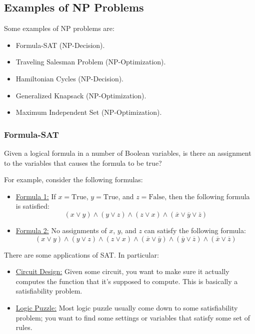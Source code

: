 \documentclass[letterpaper]{article}
\begin{document}
\subsection{Examples of NP Problems}
Some examples of NP problems are: 
\begin{itemize}
    \item Formula-SAT (NP-Decision). 
    \item Traveling Salesman Problem (NP-Optimization). 
    \item Hamiltonian Cycles (NP-Decision). 
    \item Generalized Knapsack (NP-Optimization). 
    \item Maximum Independent Set (NP-Optimization). 
\end{itemize}

\subsubsection{Formula-SAT}
Given a logical formula in a number of Boolean variables, is there an assignment to the variables that causes the formula to be true? 

\bigskip

For example, consider the following formulas: 
\begin{itemize}
    \item \underline{Formula 1:} If $x = \text{True}$, $y = \text{True}$, and $z = \text{False}$, then the following formula is satisfied: 
    \[(x \lor y) \land (y \lor z) \land (z \lor x) \land (\overline{x} \lor \overline{y} \lor \overline{z})\]

    \item \underline{Formula 2:} No assignments of $x$, $y$, and $z$ can satisfy the following formula: 
    \[(x \lor y) \land (y \lor z) \land (z \lor x) \land (\overline{x} \lor \overline{y}) \land (\overline{y} \lor \overline{z}) \land (\overline{x} \lor \overline{z})\]
\end{itemize}
There are some applications of SAT. In particular: 
\begin{itemize}
    \item \underline{Circuit Design:} Given some circuit, you want to make sure it actually computes the function that it's supposed to compute. This is basically a satisfiability problem.
    \item \underline{Logic Puzzle:} Most logic puzzle usually come down to some satisfiability problem; you want to find some settings or variables that satisfy some set of rules. 
\end{itemize}
\end{document}
